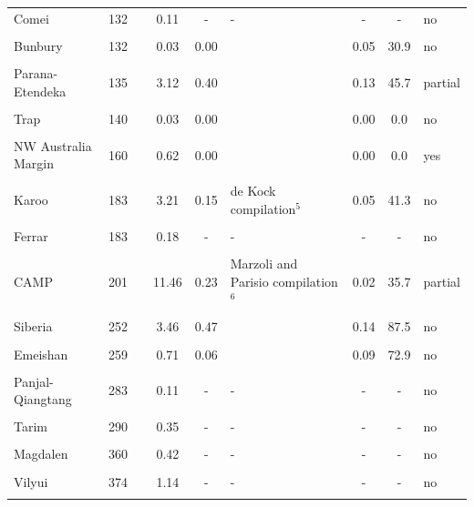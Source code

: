\begin{table}[!htbp]
{\begin{tabular}{lc>{\raggedright}p{4cm}cc>{\raggedright}p{4cm}ccl}
Comei & 132 & \citet{Zhu2009a} & 0.11 & - & - & - & - & no \\
 & & & & & & & & \\
Bunbury & 132 & \citet{Zhu2009a} & 0.03 & 0.00 & \citet{Thorne2014a} & 0.05 & 30.9 & no \\
 & & & & & & & & \\
Parana-Etendeka & 135 & \citet{Florisbal2014a, Almeida2018a} & 3.12 & 0.40 & \citet{Coffin2006a} & 0.13 & 45.7 & partial \\
 & & & & & & & & \\
Trap & 140 & \citet{Ernst2001a} & 0.03 & 0.00 & \citet{Ernst2001a} & 0.00 & 0.0 & no \\
 & & & & & & & & \\
NW Australia Margin & 160 & \citet{Pirajno2012a} & 0.62 & 0.00 & \citet{Coffin2006a} & 0.00 & 0.0 & yes \\
 & & & & & & & & \\
Karoo & 183 & \citet{Burgess2015a} & 3.21 & 0.15 & de Kock compilation$^{5}$ & 0.05 & 41.3 & no \\
 & & & & & & & & \\
Ferrar & 183 & \citet{Burgess2015a} & 0.18 & - & - & - & - & no \\
 & & & & & & & & \\
CAMP & 201 & \citet{Blackburn2013a} & 11.46 & 0.23 & Marzoli and Parisio compilation$^{6}$ & 0.02 & 35.7 & partial \\
 & & & & & & & & \\
Siberia & 252 & \citet{Burgess2015b} & 3.46 & 0.47 & \citet{Coffin2006a} & 0.14 & 87.5 & no \\
 & & & & & & & & \\
Emeishan & 259 & \citet{Zhou2002a} & 0.71 & 0.06 & \citet{Coffin2006a} & 0.09 & 72.9 & no \\
 & & & & & & & & \\
Panjal-Qiangtang & 283 & \citet{Zhai2013a} & 0.11 & - & - & - & - & no \\
 & & & & & & & & \\
Tarim & 290 & \citet{Xu2014a} & 0.35 & - & - & - & - & no \\
 & & & & & & & & \\
Magdalen & 360 & \citet{Murphy1999a} & 0.42 & - & - & - & - & no \\
 & & & & & & & & \\
Vilyui & 374 & \citet{Ricci2013a} & 1.14 & - & - & - & - & no \\
 & & & & & & & & \\

\end{tabular}}
\end{table}

